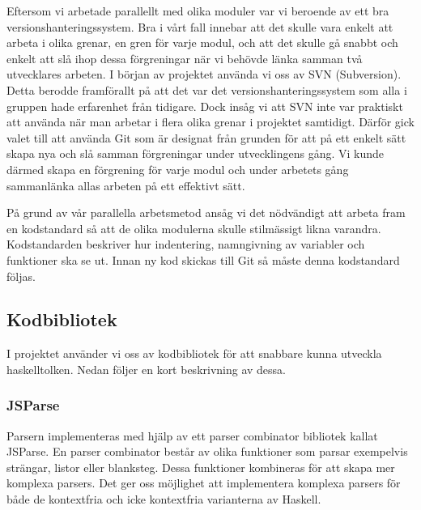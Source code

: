 Eftersom vi arbetade parallellt med olika moduler var vi beroende av ett bra versionshanteringssystem. Bra i vårt fall innebar att det skulle vara enkelt att arbeta i olika grenar, en gren för varje modul, och att det skulle gå snabbt och enkelt att slå ihop dessa förgreningar när vi behövde länka samman två utvecklares arbeten. I början av projektet använda vi oss av SVN (Subversion). Detta berodde framförallt på att det var det versionshanteringssystem som alla i gruppen hade erfarenhet från tidigare. Dock insåg vi att SVN inte var praktiskt att använda när man arbetar i flera olika grenar i projektet samtidigt. Därför gick valet till att använda Git som är designat från grunden för att på ett enkelt sätt skapa nya och slå samman förgreningar under utvecklingens gång. Vi kunde därmed skapa en förgrening för varje modul och under arbetets gång sammanlänka allas arbeten på ett effektivt sätt. 

På grund av vår parallella arbetsmetod ansåg vi det nödvändigt att arbeta fram en kodstandard så att de olika modulerna skulle stilmässigt likna varandra. Kodstandarden beskriver hur indentering, namngivning av variabler och funktioner ska se ut. Innan ny kod skickas till Git så måste denna kodstandard följas.  


\subsection{Kodbibliotek}
I projektet använder vi oss av kodbibliotek för att snabbare kunna utveckla haskelltolken. Nedan följer en kort beskrivning av dessa.

\subsubsection{JSParse}  
Parsern implementeras med hjälp av ett parser combinator bibliotek kallat JSParse. 
En parser combinator består av olika funktioner som parsar exempelvis strängar, listor eller blanksteg.
Dessa funktioner kombineras för att skapa mer komplexa parsers. Det ger oss möjlighet att implementera komplexa
parsers för både de kontextfria och icke kontextfria varianterna av Haskell.

